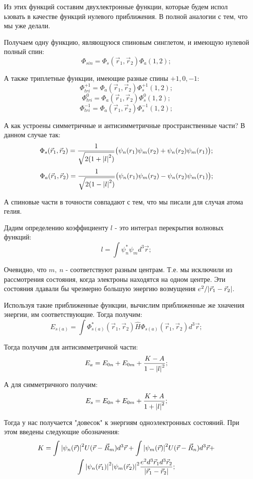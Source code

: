 \documentclass[a4paper, 14pt, russian]{article}
\newcommand{\be}{\begin{equation}}
\newcommand{\ee}{\end{equation}}
\begin{document}
	Из этих функций составим двухлектронные функции, которые будем испол ьзовать в качестве функций
	нулевого приближения. В полной аналогии  с тем, что мы уже делали.

	Получаем одну функцию, являющуюся спиновым синглетом, и имеющую нулевой полный спин:
	\be
		\Phi_{sin} = \Phi_{s} (\vec{r}_1,\vec{r}_2) \Phi_a(1,2);
	\ee

	А также триплетные функции, имеющие разные спины $+1,0,-1$:
	\be
		\Phi_{tri}^{+1} = \Phi_{a} (\vec{r}_1,\vec{r}_2) \Phi_s^{+1}(1,2);
	\ee
	\be
		\Phi_{tri}^{0} = \Phi_{a} (\vec{r}_1,\vec{r}_2) \Phi_s^{0}(1,2);
	\ee
	\be
		\Phi_{tri}^{-1} = \Phi_{a} (\vec{r}_1,\vec{r}_2) \Phi_s^{-1}(1,2);
	\ee

	А как устроены симметричные и антисимметричные пространственные части?
	В данном случае так:
	\be
		\Phi_s(\vec{r}_1,\vec{r}_2) = \frac{1}{\sqrt{2 (1 + \abs{l}^2)}} 
			\big(\psi_n(r_1) \psi_m(r_2) + \psi_n(r_2) \psi_m(r_1)\big);
	\ee
	\be
		\Phi_a(\vec{r}_1,\vec{r}_2) = \frac{1}{\sqrt{2 (1 - \abs{l}^2)}} 
			\big(\psi_n(r_1) \psi_m(r_2) - \psi_n(r_2) \psi_m(r_1)\big);
	\ee

	А спиновые части в точности совпадают с тем, что мы писали
	для случая атома гелия.

	Дадим определению коэффициенту $l$ - это интеграл перекрытия волновых функций:
	\be
		l = \int \psi^{*}_n \psi_m d^3 \vec r;
	\ee

	Очевидно, что $m,~n$ - соответствуют разным центрам. Т.е. мы исключили из рассмотрения 
	состояния, когда электроны находятся на одном центре. Эти состояния лдавали бы 
	чрезмерно большую энергию возмущения $e^2 / \abs{\vec{r}_1 - \vec{r}_2}$.

	Используя такие приближенные функции, вычислим приближенные же хначения энергии,
	им соответствующие. Тогда получим:
	\be
		E_{s(a)} = \int \Phi_{s(a)}^{*}(\vec{r}_1,\vec{r}_2) \hat{H} \Phi_{s(a)}
			(\vec{r}_1,\vec{r}_2) d^3 \vec r;
	\ee

	Тогда получим для антисимметричной части:
	\be
		E_a = E_{0n} + E_{0m} + \frac{K - A}{1 - \abs{l}^2};
	\ee

	А для симметричного получим:
	\be
		E_s = E_{0n} + E_{0m} + \frac{K + A}{1 + \abs{l}^2};
	\ee

	Тогда у нас получается "довесок" к энергиям одноэлектронных состояний.
	При этом введены следующие обозначения:
	\begin{multline}
		K = \int \abs{\psi_n(\vec r)}^2 U(\vec r - \vec{R}_m) d^3 \vec r +
		\int \abs{\psi_m(\vec r)}^2 U(\vec r - \vec{R}_n) d^3 \vec r + \\
		\int \abs{\psi_n(\vec{r}_1)}^2 \abs{\psi_m(\vec{r}_2)}^2 
		\frac{e^2 d^3 \vec{r}_1 d^3 \vec{r}_2}{\abs{\vec{r}_1 - \vec{r}_2}};
	\end{multline}
\end{document}
